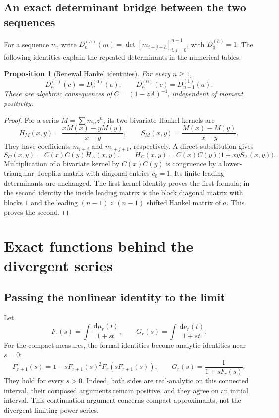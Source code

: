 \documentclass[11pt]{article}
\numberwithin{equation}{section}
\newtheorem{proposition}[theorem]{Proposition}
\theoremstyle{definition}
\theoremstyle{remark}
\newcommand{\dd}{\,\mathrm d}
\begin{document}
\subsection{An exact determinant bridge between the two sequences}
For a sequence $m$, write
$D_n^{(h)}(m)=\det[m_{i+j+h}]_{i,j=0}^{n-1}$, with $D_0^{(h)}=1$.
The following identities explain the repeated determinants in the numerical tables.
\begin{proposition}[Renewal Hankel identities]\label{gml:prop:detbridge}
For every $n\ge1$,
\begin{equation}\label{gml:eq:detbridge}
 D_n^{(1)}(c)=D_n^{(0)}(a),\qquad
 D_n^{(0)}(c)=D_{n-1}^{(1)}(a).
\end{equation}
These are algebraic consequences of $C=(1-zA)^{-1}$, independent of
moment positivity.
\end{proposition}
\begin{proof}
For a series $M=\sum m_nz^n$, its two bivariate Hankel kernels are
\[
 H_M(x,y)=\frac{xM(x)-yM(y)}{x-y},\qquad
 S_M(x,y)=\frac{M(x)-M(y)}{x-y}.
\]
They have coefficients $m_{i+j}$ and $m_{i+j+1}$, respectively.
A direct substitution gives
\[
 S_C(x,y)=C(x)C(y)H_A(x,y),\qquad
 H_C(x,y)=C(x)C(y)\bigl(1+xyS_A(x,y)\bigr).
\]
Multiplication of a bivariate kernel by $C(x)C(y)$ is congruence by a
lower-triangular Toeplitz matrix with diagonal entries $c_0=1$.
Its finite leading determinants are unchanged. The first kernel identity
proves the first formula; in the second identity the inside leading
matrix is the block diagonal matrix with blocks $1$ and the leading
$(n-1)\times(n-1)$ shifted Hankel matrix of $a$. This proves the second.
\end{proof}

\section{Exact functions behind the divergent series}\label{gml:sec:analytic}
\subsection{Passing the nonlinear identity to the limit}
Let
\[
 F_r(s)=\int\frac{\dd\mu_r(t)}{1+st},\qquad
 G_r(s)=\int\frac{\dd\nu_r(t)}{1+st}.
\]
For the compact measures, the formal identities become analytic identities
near $s=0$:
\begin{equation}\label{gml:eq:finiteanalytic}
 F_{r+1}(s)=1-sF_{r+1}(s)^2F_r(sF_{r+1}(s)),\qquad
 G_r(s)=\frac1{1+sF_r(s)}.
\end{equation}
They hold for every $s>0$. Indeed, both sides are real-analytic on this
connected interval, their composed arguments remain positive, and they
agree on an initial interval. This continuation argument concerns compact
approximants, not the divergent limiting power series.
\end{document}
